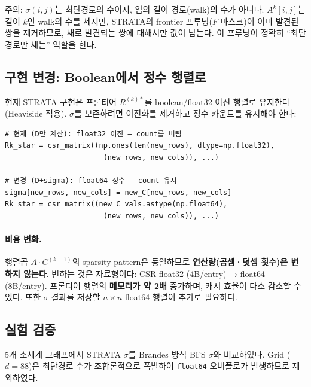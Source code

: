 \documentclass[11pt,a4paper]{article}
\begin{document}
\begin{caution}[$\sigma$와 경로 수의 구별]
주의: $\sigma(i,j)$는 최단경로의 수이지, 임의 길이 경로(walk)의 수가 아니다. $A^k[i,j]$는 길이 $k$인 walk의 수를 세지만, STRATA의 frontier 프루닝($F$ 마스크)이 이미 발견된 쌍을 제거하므로, 새로 발견되는 쌍에 대해서만 값이 남는다. 이 프루닝이 정확히 ``최단경로만 세는'' 역할을 한다.
\end{caution}


\subsection{구현 변경: Boolean에서 정수 행렬로}

현재 STRATA 구현은 프론티어 $R^{(k)*}$를 boolean/float32 이진 행렬로 유지한다 (Heaviside 적용). $\sigma$를 보존하려면 이진화를 제거하고 정수 카운트를 유지해야 한다:

\begin{lstlisting}
# 현재 (D만 계산): float32 이진 — count를 버림
Rk_star = csr_matrix((np.ones(len(new_rows), dtype=np.float32),
                       (new_rows, new_cols)), ...)

# 변경 (D+sigma): float64 정수 — count 유지
sigma[new_rows, new_cols] = new_C[new_rows, new_cols]
Rk_star = csr_matrix((new_C_vals.astype(np.float64),
                       (new_rows, new_cols)), ...)
\end{lstlisting}

\paragraph{비용 변화.}
행렬곱 $A \cdot C^{(k-1)}$의 sparsity pattern은 동일하므로 \textbf{연산량(곱셈·덧셈 횟수)은 변하지 않는다}. 변하는 것은 자료형이다: CSR float32 (4B/entry) → float64 (8B/entry). 프론티어 행렬의 \textbf{메모리가 약 2배} 증가하며, 캐시 효율이 다소 감소할 수 있다. 또한 $\sigma$ 결과를 저장할 $n \times n$ float64 행렬이 추가로 필요하다.


\subsection{실험 검증}

5개 소세계 그래프에서 STRATA $\sigma$를 Brandes 방식 BFS $\sigma$와 비교하였다. Grid ($d\!=\!88$)은 최단경로 수가 조합론적으로 폭발하여 \texttt{float64} 오버플로가 발생하므로 제외하였다.
\end{document}
